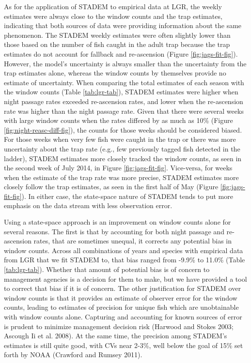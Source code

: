 \documentclass[
  12pt,
]{article}
\begin{document}
As for the application of STADEM to empirical data at LGR, the weekly estimates were always close to the window counts and the trap estimates, indicating that both sources of data were providing information about the same phenomenon. The STADEM weekly estimates were often slightly lower than those based on the number of fish caught in the adult trap because the trap estimates do not account for fallback and re-ascension (Figure \ref{fig:jags-fit-fig}). However, the model's uncertainty is always smaller than the uncertainty from the trap estimates alone, whereas the window counts by themselves provide no estimate of uncertainty. When comparing the total estimates of each season with the window counts (Table \ref{tab:lgr-tab}), STADEM estimates were higher when night passage rates exceeded re-ascension rates, and lower when the re-ascension rate was higher than the night passage rate. Given that there were several weeks with large window counts when the rates differed by as much as 10\% (Figure \ref{fig:night-reasc-diff-fig}), the counts for those weeks should be considered biased. For those weeks when very few fish were caught in the trap or there was more uncertainty about the trap rate (e.g., few previously tagged fish detected in the ladder), STADEM estimates more closely tracked the window counts, as seen in the second week of July 2014, in Figure \ref{fig:jags-fit-fig}. Vice-versa, for weeks when the estimate of the trap rate was more precise, STADEM estimates more closely follow the trap estimates, as seen in the first half of May (Figure \ref{fig:jags-fit-fig}). In either case, the state-space nature of STADEM tends to put more emphasis on the data stream with less observation error.

Using a state-space approach is an improvement on window counts alone for several reasons. The first is that by accounting for both night passage and re-ascension rates, that are sometimes unequal, it corrects any potential bias in window counts. Across all combinations of years and species with empirical data from LGR that we fit STADEM to, that bias ranged from -9.9\% to 11.0\% (Table \ref{tab:lgr-tab}). Whether that amount of potential bias is of concern to management agencies is a decision for them to make, but we have provided a tool to correct that bias if it is of concern. The other justification for STADEM over window counts is that it provides an estimate of observer error for the window counts, leading to estimates of precision for unique fish which are unobtainable with window counts alone. Capturing and accounting for known sources of error is prudent to minimize management decision risk (Harwood and Stokes 2003; Ascough Ii et al. 2008). At the same time, the precision among STADEM's estimates is still quite good, with CVs near 2-3\%, well below the goal of 15\% set forth by NOAA (Crawford and Rumsey 2011).
\end{document}
